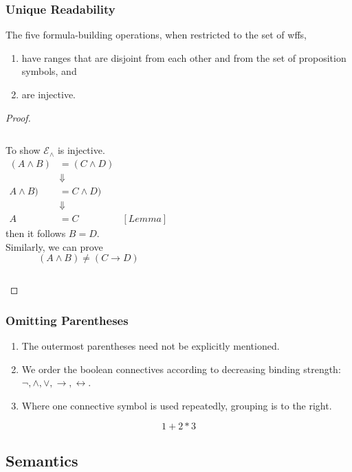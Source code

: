 \documentclass[UTF8,aspectratio=43,11pt,colorlinks,compress,openany]{beamer}%
\begin{document}
\begin{frame}\frametitle{Unique Readability}
	\begin{theorem}
		The five formula-building operations, when restricted to the set of wffs,
		\begin{enumerate}
			\item have ranges that are disjoint from each other and from the set of proposition symbols, and
			\item are injective.
		\end{enumerate}
	\end{theorem}
	\begin{proof}
		\begin{columns}
				To show $\mathcal{E}_\wedge$ is injective.
				\begin{align*}
				(A\wedge B)&=(C\wedge D)\\
				&\Downarrow\\
				 A\wedge B)&=C\wedge D)\\
				&\Downarrow\\
				 A&=C &[Lemma]
				\end{align*}
				then it follows $B=D$.\\
				
				Similarly, we can prove
				\[(A\wedge B)\neq(C\to D)\]
		\end{columns}
	\end{proof}
\end{frame}

\begin{frame}\frametitle{Omitting Parentheses}
	\begin{enumerate}
		\item The outermost parentheses need not be explicitly mentioned.
		\item We order the boolean connectives according to decreasing binding strength: $\neg, \wedge, \vee, \to, \leftrightarrow$.
		\item Where one connective symbol is used repeatedly, grouping is to the right.
	\end{enumerate}
	\[1+2*3\]
\end{frame}

\subsection{Semantics}
\end{document}
